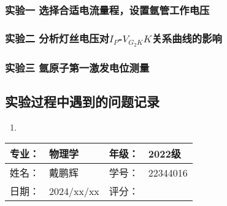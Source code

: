 \documentclass[dvipsnames, svgnames,a4paper,11pt]{article}
\begin{document}
	\subsubsection{实验一 \quad 选择合适电流量程，设置氩管工作电压}
	
	



	\subsubsection{实验二 \quad 分析灯丝电压对$I_P$-$V_{G_2K}K$关系曲线的影响}






	\subsubsection{实验三 \quad 氩原子第一激发电位测量}

		









\subsection{实验过程中遇到的问题记录}

\begin{enumerate}
	\item 	
	
\end{enumerate}
	

\clearpage
\begin{table}
	\renewcommand\arraystretch{1.7}
	\begin{tabularx}{\textwidth}{|X|X|X|X|}
	\hline
	专业：& 物理学 &年级：& 2022级\\
	\hline
	姓名： & 戴鹏辉 & 学号：& 22344016\\
	\hline
    日期：& 2024/xx/xx & 评分： &\\
	\hline
	\end{tabularx}
\end{table}
\end{document}
